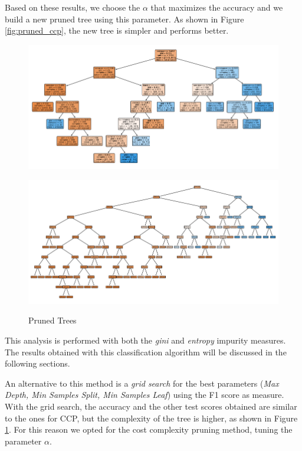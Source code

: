 \documentclass[a4paper,11pt,dvipsnames]{article}
\begin{document}
Based on these results, we choose the $\alpha$ that maximizes the accuracy and we build a new pruned tree using this parameter. As shown in Figure \ref{fig:pruned_ccp}, the new tree is simpler and performs better.

\begin{figure}[h]
\centering
\begin{minipage}{0.49\linewidth}
    \centering
    \includegraphics[width=\textwidth]{pruned_tree_arousal.png}
    \label{fig:pruned_ccp}
    \end{minipage}\hfil
    \begin{minipage}{0.48\linewidth}
    \centering
    \includegraphics[width=\textwidth]{pruned_tree_citraro.png}
    \label{fig:pruned_grid}
    \end{minipage}
    \caption{Pruned Trees}
\end{figure}
This analysis is performed with both the \textit{gini} and \textit{entropy} impurity measures. The results obtained with this classification algorithm will be discussed in the following sections.

An alternative to this method is a \textit{grid search} for the best parameters (\textit{Max Depth, Min Samples Split, Min Samples Leaf}) using the F1 score as measure. With the grid search, the accuracy and the other test scores obtained are similar to the ones for CCP, but the complexity of the tree is higher, as shown in Figure \ref{fig:pruned_grid}. For this reason we opted for the cost complexity pruning method, tuning the parameter $\alpha$.
\end{document}
